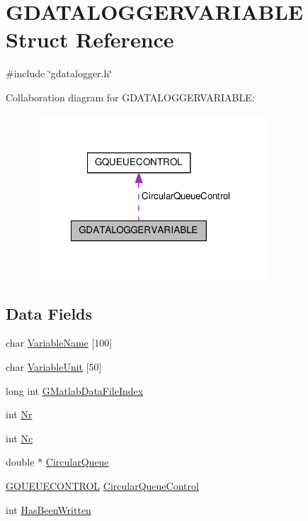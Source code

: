 \hypertarget{structGDATALOGGERVARIABLE}{\section{G\-D\-A\-T\-A\-L\-O\-G\-G\-E\-R\-V\-A\-R\-I\-A\-B\-L\-E Struct Reference}
\label{structGDATALOGGERVARIABLE}
}


{\ttfamily \#include \char`\"{}gdatalogger.\-h\char`\"{}}



Collaboration diagram for G\-D\-A\-T\-A\-L\-O\-G\-G\-E\-R\-V\-A\-R\-I\-A\-B\-L\-E\-:\nopagebreak
\begin{figure}[H]
\begin{center}
\leavevmode
\includegraphics[width=248pt]{structGDATALOGGERVARIABLE__coll__graph}
\end{center}
\end{figure}
\subsection*{Data Fields}
\begin{DoxyCompactItemize}
\item 
char \hyperlink{structGDATALOGGERVARIABLE_a336b7b6cbfc9cdebc7e1ade3de17ac3f}{Variable\-Name} \mbox{[}100\mbox{]}
\item 
char \hyperlink{structGDATALOGGERVARIABLE_a0d42da63f3f904774cbf2ee8d92ee135}{Variable\-Unit} \mbox{[}50\mbox{]}
\item 
long int \hyperlink{structGDATALOGGERVARIABLE_aa1cd5b838d8655734e7d4499b25bf22a}{G\-Matlab\-Data\-File\-Index}
\item 
int \hyperlink{structGDATALOGGERVARIABLE_a68c3eb0f57a786afe9a2658fc42b61d6}{Nr}
\item 
int \hyperlink{structGDATALOGGERVARIABLE_abd1db7599f09e121cd125e665cb9c460}{Nc}
\item 
double $\ast$ \hyperlink{structGDATALOGGERVARIABLE_ae17ad02442f31da9518c99ce13607c8b}{Circular\-Queue}
\item 
\hyperlink{structGQUEUECONTROL}{G\-Q\-U\-E\-U\-E\-C\-O\-N\-T\-R\-O\-L} \hyperlink{structGDATALOGGERVARIABLE_a1a50747d2223f228288b4656470d9bbc}{Circular\-Queue\-Control}
\item 
int \hyperlink{structGDATALOGGERVARIABLE_ad982aef10e8496c2a1c6b9bb1f1dc5c3}{Has\-Been\-Written}
\end{DoxyCompactItemize}


